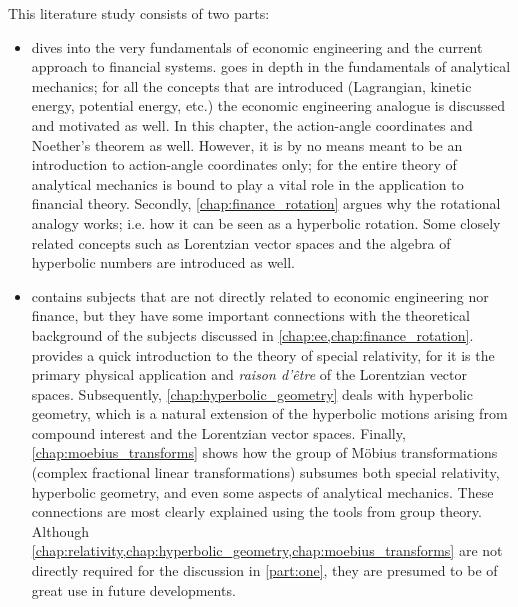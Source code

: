 This literature study consists of two parts: 
\begin{itemize}
    \item \textbf{} dives into the very fundamentals of economic engineering and the current approach to financial systems.  goes in depth in the fundamentals of analytical mechanics; for all the concepts that are introduced (Lagrangian, kinetic energy, potential energy, etc.) the economic engineering analogue is discussed and motivated as well. In this chapter, the action-angle coordinates and Noether's theorem as well. However, it is by no means meant to be an introduction to action-angle coordinates only; for the entire theory of analytical mechanics is bound to play a vital role in the application to financial theory. Secondly, \cref{chap:finance_rotation} argues why the rotational analogy works; i.e. how it can be seen as a hyperbolic rotation. Some closely related concepts such as Lorentzian vector spaces and the algebra of hyperbolic numbers are introduced as well.
    \item \textbf{} contains subjects that are not directly related to economic engineering nor finance, but they have some important connections with the theoretical background of the subjects discussed in \cref{chap:ee,chap:finance_rotation}.  provides a quick introduction to the theory of special relativity, for it is the primary physical application and \emph{raison d'être} of the Lorentzian vector spaces. Subsequently, \cref{chap:hyperbolic_geometry} deals with hyperbolic geometry, which is a natural extension of the hyperbolic motions arising from compound interest and the Lorentzian vector spaces. Finally, \cref{chap:moebius_transforms} shows how the group of Möbius transformations (complex fractional linear transformations) subsumes both special relativity, hyperbolic geometry, and even some aspects of analytical mechanics. These connections are most clearly explained using the tools from group theory. Although \cref{chap:relativity,chap:hyperbolic_geometry,chap:moebius_transforms} are not directly required for the discussion in \cref{part:one}, they are presumed to be of great use in future developments.
\end{itemize}




